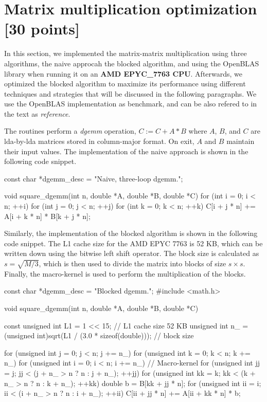 \documentclass[unicode,11pt,a4paper,oneside,numbers=endperiod,openany]{scrartcl}
\begin{document}
\section{Matrix multiplication optimization [30 points]}
In this section, we implemented the matrix-matrix multiplication using three algorithms, the naive approcah
the blocked algorithm, and using the OpenBLAS library when running it on an \textbf{AMD EPYC\_7763 CPU}. 
Afterwards, we optimized the blocked algorithm to maximize its performance using different techniques and 
strategies that will be discussed in the following paragraphs. We use the OpenBLAS implementation as 
benchmark, and can be also refered to in the text as \textit{reference}.

The routines perform a \textit{dgemm} operation, $C := C + A * B$
where $A$, $B$, and $C$ are lda-by-lda matrices stored in column-major format.
On exit, $A$ and $B$ maintain their input values. The implementation of the naive approach is shown in the following code snippet.
\begin{cppverbatim}
const char *dgemm_desc = "Naive, three-loop dgemm.";

void square_dgemm(int n, double *A, double *B, double *C)
{
  for (int i = 0; i < n; ++i)
  {
    for (int j = 0; j < n; ++j)
    {
      for (int k = 0; k < n; ++k)
      {
        C[i + j * n] += A[i + k * n] * B[k + j * n];
      }
    }
  }
}

\end{cppverbatim}
Similarly, the implementation of the blocked algorithm is shown in the following code snippet.
The L1 cache size for the AMD EPYC 7763 is 52 KB, which can be written down using the bitwise
left shift operator. The block size is calculated as $s = \sqrt{M/ 3}$, which is then
used to divide the matrix into blocks of size $s \times s$. Finally, the macro-kernel
is used to perform the multiplication of the blocks.
\begin{cppverbatim}
const char *dgemm_desc = "Blocked dgemm.";
#include <math.h>

void square_dgemm(int n, double *A, double *B, double *C)
{
  const unsigned int L1 = 1 << 15;                                   // L1 cache size 52 KB
  unsigned int n_ = (unsigned int)sqrt(L1 / (3.0 * sizeof(double))); // block size

  for (unsigned int j = 0; j < n; j += n_)
  {
    for (unsigned int k = 0; k < n; k += n_)
    {
      for (unsigned int i = 0; i < n; i += n_)
      {
        // Macro-kernel
        for (unsigned int jj = j; jj < (j + n_ > n ? n : j + n_); ++jj)
        {
          for (unsigned int kk = k; kk < (k + n_ > n ? n : k + n_); ++kk)
          {
            double b = B[kk + jj * n];
            for (unsigned int ii = i; ii < (i + n_ > n ? n : i + n_); ++ii)
            {
              C[ii + jj * n] += A[ii + kk * n] * b;
            }
          }
        }
      }
    }
  }
}

\end{cppverbatim}
\end{document}
